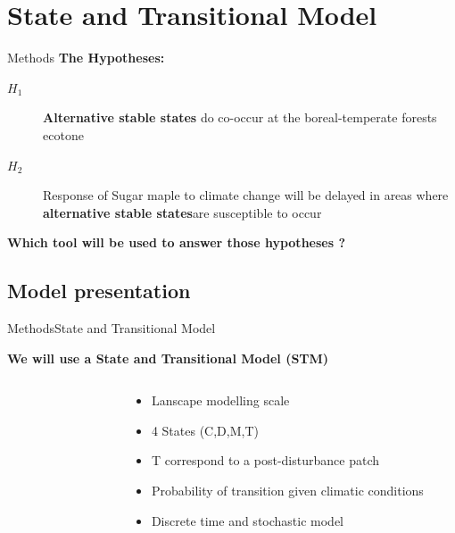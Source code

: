 \documentclass[table]{eecslides}
\begin{document}
\section{State and Transitional Model}
\begin{frame}[t]{Methods}
	\textbf{The Hypotheses: }
	\begin{description}
		\item [$H_1$] \alert{\textbf{Alternative stable states}} do co-occur at the boreal-temperate forests ecotone
		\item [$H_2$] Response of Sugar maple to climate change will be delayed in areas where \alert{\textbf{alternative stable states}}are susceptible to occur
	\end{description}
\textbf{Which tool will be used to answer those hypotheses ?}
\end{frame}

\subsection{Model presentation}

\begin{frame}[t]{Methods}{State and Transitional Model}

\textbf{We will use a State and Transitional Model (STM)}

\vspace{-1.5em}
\begin{columns}[c]
	\begin{column}[c]{.40\paperwidth}
		\begin{figure}
			\small{}
		\end{figure}
	\end{column}
	\begin{column}[l]{.40\paperwidth}
		\begin{itemize}
			\item Lanscape modelling scale
			\item 4 States (C,D,M,T)
			\item T correspond to a post-disturbance patch
			\item Probability of transition given climatic conditions
			\item Discrete time and stochastic model
		\end{itemize}
	\end{column}
\end{columns}

\end{frame}
\end{document}
